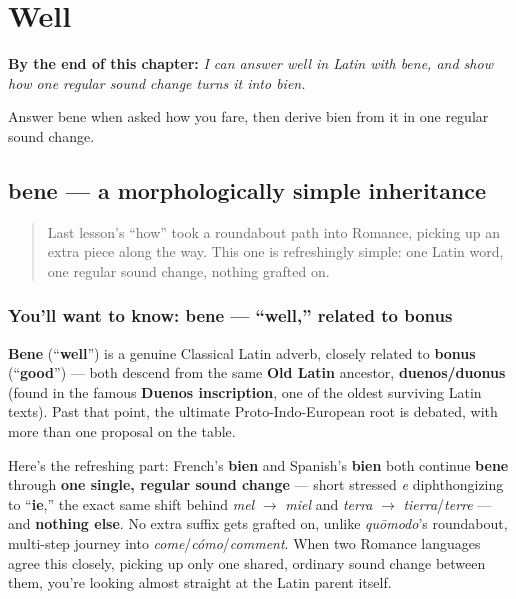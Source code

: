 
\chapter{Well}
\label{ch:la-well}

\begin{chapteropening}
\textbf{By the end of this chapter:} \emph{I can answer well in Latin with bene, and show how one regular sound change turns it into bien.}

Answer bene when asked how you fare, then derive bien from it in one regular sound change.
\end{chapteropening}

\section[bene]{bene — a morphologically simple inheritance}

\label{lesson:LA-C27-bene}



\begin{quote}
Last lesson's \textquotedblleft{}how\textquotedblright{} took a roundabout path into Romance, picking up an extra piece along the way. This one is refreshingly simple: one Latin word, one regular sound change, nothing grafted on.
\end{quote}

\subsection*{You'll want to know: bene — \textquotedblleft{}well,\textquotedblright{} related to bonus}
\textbf{Bene} (\textquotedblleft{}\textbf{well}\textquotedblright{}) is a genuine Classical Latin adverb, closely related to \textbf{bonus} (\textquotedblleft{}\textbf{good}\textquotedblright{}) — both descend from the same \textbf{Old Latin} ancestor, \textbf{duenos/duonus} (found in the famous \textbf{Duenos inscription}, one of the oldest surviving Latin texts). Past that point, the ultimate Proto-Indo-European root is debated, with more than one proposal on the table.

\begin{cousinweb}
Here's the refreshing part: French's \textbf{bien} and Spanish's \textbf{bien} both continue \textbf{bene} through \textbf{one single, regular sound change} — short stressed \emph{e} diphthongizing to \textquotedblleft{}\textbf{ie},\textquotedblright{} the exact same shift behind \emph{mel} $\to$ \emph{miel} and \emph{terra} $\to$ \emph{tierra}/\emph{terre} — and \textbf{nothing else}. No extra suffix gets grafted on, unlike \emph{quōmodo}'s roundabout, multi-step journey into \emph{come}/\emph{cómo}/\emph{comment}. When two Romance languages agree this closely, picking up only one shared, ordinary sound change between them, you're looking almost straight at the Latin parent itself.
\end{cousinweb}

